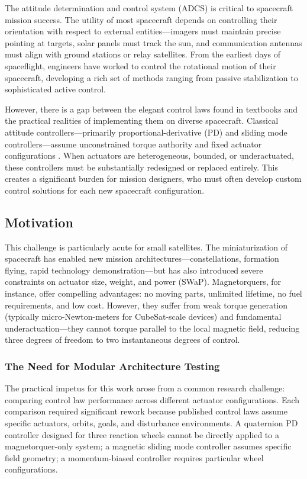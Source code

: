 \documentclass[conference]{IEEEtran}
\begin{document}
The attitude determination and control system (ADCS) is critical to spacecraft mission success. The utility of most spacecraft depends on controlling their orientation with respect to external entities---imagers must maintain precise pointing at targets, solar panels must track the sun, and communication antennas must align with ground stations or relay satellites. From the earliest days of spaceflight, engineers have worked to control the rotational motion of their spacecraft, developing a rich set of methods ranging from passive stabilization to sophisticated active control.

However, there is a gap between the elegant control laws found in textbooks and the practical realities of implementing them on diverse spacecraft. Classical attitude controllers---primarily proportional-derivative (PD) and sliding mode controllers---assume unconstrained torque authority and fixed actuator configurations \cite{markley_fundamentals_2014}. When actuators are heterogeneous, bounded, or underactuated, these controllers must be substantially redesigned or replaced entirely. This creates a significant burden for mission designers, who must often develop custom control solutions for each new spacecraft configuration.

\subsection{Motivation}
This challenge is particularly acute for small satellites. The miniaturization of spacecraft has enabled new mission architectures---constellations, formation flying, rapid technology demonstration---but has also introduced severe constraints on actuator size, weight, and power (SWaP). Magnetorquers, for instance, offer compelling advantages: no moving parts, unlimited lifetime, no fuel requirements, and low cost. However, they suffer from weak torque generation (typically micro-Newton-meters for CubeSat-scale devices) and fundamental underactuation---they cannot torque parallel to the local magnetic field, reducing three degrees of freedom to two instantaneous degrees of control.

\subsubsection{The Need for Modular Architecture Testing}
The practical impetus for this work arose from a common research challenge: comparing control law performance across different actuator configurations. Each comparison required significant rework because published control laws assume specific actuators, orbits, goals, and disturbance environments. A quaternion PD controller designed for three reaction wheels cannot be directly applied to a magnetorquer-only system; a magnetic sliding mode controller assumes specific field geometry; a momentum-biased controller requires particular wheel configurations.
\end{document}
